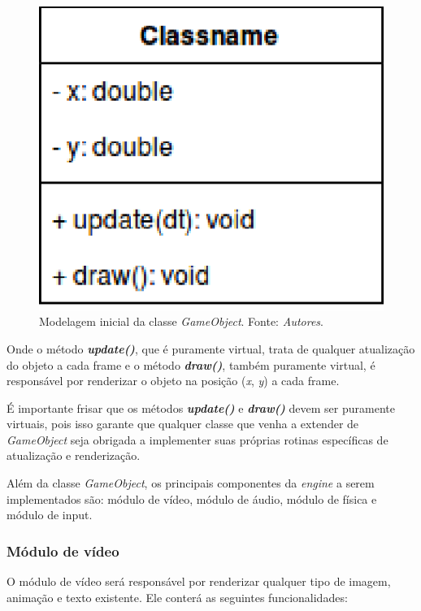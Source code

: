     \begin{figure}[H]
      \centering \includegraphics[keepaspectratio=true,scale=0.6]{figuras/game-object.eps}
      \caption[Modelagem inicial da classe \textit{GameObject}]
        {Modelagem inicial da classe \textit{GameObject}. Fonte: \textit{Autores}.}
      \label{game-object}
    \end{figure}

    Onde o método \textbf{\textit{update()}}, que é puramente virtual, trata de qualquer atualização do objeto a cada frame e o método \textbf{\textit{draw()}}, também puramente virtual, é responsável por renderizar o objeto na posição (\textit{x}, \textit{y}) a cada frame.

    É importante frisar que os métodos \textbf{\textit{update()}} e \textbf{\textit{draw()}} devem ser puramente virtuais, pois isso garante que qualquer classe que venha a extender de \textit{GameObject} seja obrigada a implementer suas próprias rotinas específicas de atualização e renderização.

    Além da classe \textit{GameObject}, os principais componentes da \textit{engine} a serem implementados são: módulo de vídeo, módulo de áudio, módulo de física e módulo de input.

    \subsubsection{Módulo de vídeo}

      O módulo de vídeo será responsável por renderizar qualquer tipo de imagem, animação e texto existente. Ele conterá as seguintes funcionalidades:

